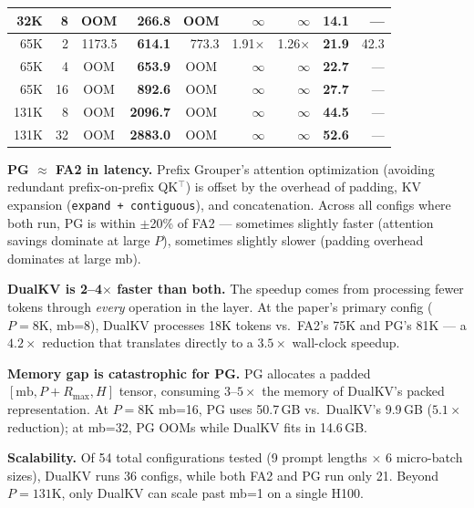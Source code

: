 \documentclass{article}
\begin{document}
\begin{table}[ht]
\begin{tabular}{@{}rr|rrr|rr|rr@{}}
32K  & 8  & \multicolumn{1}{c}{OOM} & \textbf{266.8} & \multicolumn{1}{c|}{OOM} & $\infty$ & $\infty$ & \textbf{14.1} & --- \\
\midrule
65K  & 2  & 1173.5 & \textbf{614.1} & 773.3  & 1.91$\times$ & 1.26$\times$ & \textbf{21.9} & 42.3 \\
65K  & 4  & \multicolumn{1}{c}{OOM} & \textbf{653.9} & \multicolumn{1}{c|}{OOM} & $\infty$ & $\infty$ & \textbf{22.7} & --- \\
65K  & 16 & \multicolumn{1}{c}{OOM} & \textbf{892.6} & \multicolumn{1}{c|}{OOM} & $\infty$ & $\infty$ & \textbf{27.7} & --- \\
\midrule
131K & 8  & \multicolumn{1}{c}{OOM} & \textbf{2096.7} & \multicolumn{1}{c|}{OOM} & $\infty$ & $\infty$ & \textbf{44.5} & --- \\
131K & 32 & \multicolumn{1}{c}{OOM} & \textbf{2883.0} & \multicolumn{1}{c|}{OOM} & $\infty$ & $\infty$ & \textbf{52.6} & --- \\
\bottomrule
\end{tabular}
\end{table}


\textbf{PG $\approx$ FA2 in latency.} Prefix Grouper's attention optimization (avoiding redundant prefix-on-prefix QK$^\top$) is offset by the overhead of padding, KV expansion (\texttt{expand + contiguous}), and concatenation. Across all configs where both run, PG is within $\pm$20\% of FA2 --- sometimes slightly faster (attention savings dominate at large $P$), sometimes slightly slower (padding overhead dominates at large mb).

\textbf{DualKV is 2--4$\times$ faster than both.} The speedup comes from processing fewer tokens through \emph{every} operation in the layer. At the paper's primary config ($P{=}8\text{K}$, mb=8), DualKV processes 18K tokens vs.\ FA2's 75K and PG's 81K --- a $4.2\times$ reduction that translates directly to a $3.5\times$ wall-clock speedup.

\textbf{Memory gap is catastrophic for PG.} PG allocates a padded $[\text{mb}, P+R_{\max}, H]$ tensor, consuming $3$--$5\times$ the memory of DualKV's packed representation. At $P{=}8\text{K}$ mb=16, PG uses 50.7\,GB vs.\ DualKV's 9.9\,GB ($5.1\times$ reduction); at mb=32, PG OOMs while DualKV fits in 14.6\,GB.

\textbf{Scalability.} Of 54 total configurations tested (9 prompt lengths $\times$ 6 micro-batch sizes), DualKV runs 36 configs, while both FA2 and PG run only 21. Beyond $P{=}131\text{K}$, only DualKV can scale past mb=1 on a single H100.
\end{document}
